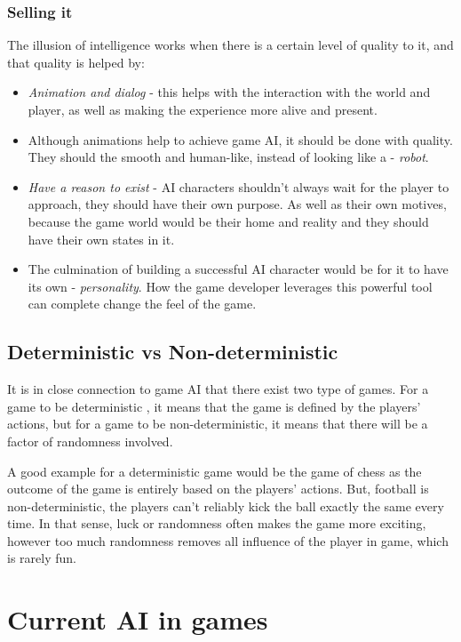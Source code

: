 \documentclass[a4paper, 12pt]{book}
\begin{document}
\subsection{Selling it}
The illusion of intelligence \cite{IllusionOfIntelligece} works when there is a certain level of quality to it, and that quality is helped by:
\begin{itemize}
    \item \emph{Animation and dialog} - this helps with the interaction with the world and player, as well as making the experience more alive and present.
    \item Although animations help to achieve game AI, it should be done with quality. They should the smooth and human-like, instead of looking like a - \emph{robot}.
    \item \emph{Have a reason to exist} - AI characters shouldn't always wait for the player to approach, they should have their own purpose. As well as their own motives, because the game world would be their home and reality and they should have their own states in it.
    \item The culmination of building a successful AI character would be for it to have its own - \emph{personality}. How the game developer leverages this powerful tool can complete change the feel of the game.
\end{itemize}


\section{Deterministic vs Non-deterministic}
It is in close connection to game AI that there exist two type of games. 
For a game to be deterministic \cite{DeepLearningGO}, it means that the game is defined by the players' actions, but for a game to be non-deterministic, it means that there will be a factor of randomness involved.

A good example for a deterministic game would be the game of chess as the outcome of the game is entirely based on the players' actions. But, football is non-deterministic, the players can't reliably kick the ball exactly the same every time. In that sense, luck or randomness often makes the game more exciting, however too much randomness removes all influence of the player in game, which is rarely fun.


\chapter{Current AI in games}
\label{ch2}
\end{document}
